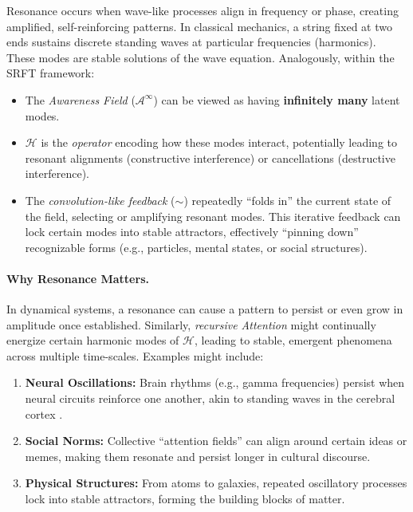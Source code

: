 \documentclass[12pt,a4paper]{article}
\begin{document}
Resonance occurs when wave-like processes align in frequency or phase, creating amplified,
self-reinforcing patterns. In classical mechanics, a string fixed at two ends sustains
discrete standing waves at particular frequencies (harmonics). These modes are stable
solutions of the wave equation. Analogously, within the SRFT framework:
\begin{itemize}
    \item The \emph{Awareness Field} (\(\mathscr{A}^\infty\)) can be viewed as having
    \textbf{infinitely many} latent modes. 
    \item \(\mathcal{H}\) is the \emph{operator} encoding how these modes interact,
    potentially leading to resonant alignments (constructive interference) or cancellations
    (destructive interference).
    \item The \emph{convolution-like feedback} (\(\sim\)) repeatedly “folds in” the current
    state of the field, selecting or amplifying resonant modes. This iterative feedback
    can lock certain modes into stable attractors, effectively “pinning down” recognizable
    forms (e.g., particles, mental states, or social structures).
\end{itemize}

\paragraph{Why Resonance Matters.}
In dynamical systems, a resonance can cause a pattern to persist or even grow in amplitude
once established. Similarly, \emph{recursive Attention} might continually energize certain
harmonic modes of \(\mathcal{H}\), leading to stable, emergent phenomena across multiple
time-scales. Examples might include:
\begin{enumerate}
    \item \textbf{Neural Oscillations:} Brain rhythms (e.g., gamma frequencies) persist
    when neural circuits reinforce one another, akin to standing waves in the cerebral
    cortex \cite{friston2010, tononi2008}.
    \item \textbf{Social Norms:} Collective “attention fields” can align around certain
    ideas or memes, making them resonate and persist longer in cultural discourse.
    \item \textbf{Physical Structures:} From atoms to galaxies, repeated oscillatory
    processes lock into stable attractors, forming the building blocks of matter.
\end{enumerate}
\end{document}
